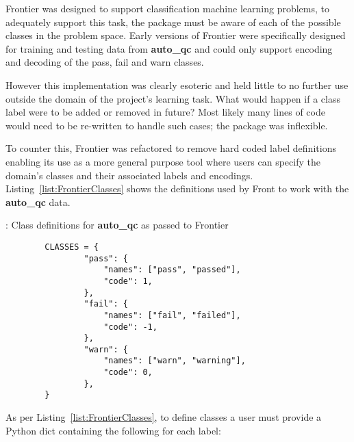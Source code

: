 Frontier was designed to support classification machine learning problems, to
adequately support this task, the package must be aware of each of the possible
classes in the problem space. Early versions of Frontier were specifically
designed for training and testing data from \textbf{auto\_qc} and could only
support encoding and decoding of the pass, fail and warn classes.

However this implementation was clearly esoteric and held little to no further
use outside the domain of the project's learning task. What would happen if a
class label were to be added or removed in future? Most likely many lines of
code would need to be re-written to handle such cases; the package was
inflexible.

To counter this, Frontier was refactored to remove hard coded label definitions
enabling its use as a more general purpose tool where users can specify the
domain's classes and their associated labels and encodings.
Listing~\ref{list:FrontierClasses} shows the definitions used by Front to work
with the \textbf{auto\_qc} data.

\begin{listing}[H]
    \caption[FrontierClasses]{: Class definitions for \textbf{auto\_qc} as passed to Frontier}
    \label{list:FrontierClasses}
    \begin{verbatim}
        CLASSES = {
                "pass": {
                    "names": ["pass", "passed"],
                    "code": 1,
                },
                "fail": {
                    "names": ["fail", "failed"],
                    "code": -1,
                },
                "warn": {
                    "names": ["warn", "warning"],
                    "code": 0,
                },
        }
    \end{verbatim}
\end{listing}

As per Listing~\ref{list:FrontierClasses}, to define classes a user must provide
a Python dict containing the following for each label:

